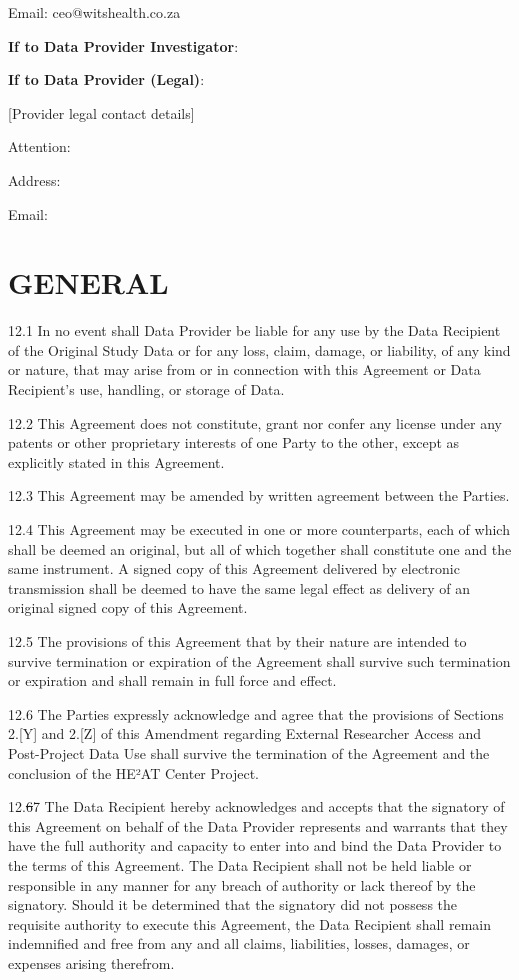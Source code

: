\documentclass[12pt,letterpaper]{article}
\newcommand{\deleted}[1]{\textcolor{deletecolor}{\sout{#1}}}
\newcommand{\added}[1]{\textcolor{addcolor}{#1}}
\begin{document}
Email: ceo@witshealth.co.za

\textbf{If to Data Provider Investigator}:

\textbf{If to Data Provider (Legal)}:

[Provider legal contact details]

Attention:

Address:

Email:

\section{GENERAL}

12.1 In no event shall Data Provider be liable for any use by the Data Recipient of the Original Study Data or for any loss, claim, damage, or liability, of any kind or nature, that may arise from or in connection with this Agreement or Data Recipient's use, handling, or storage of Data.

12.2 This Agreement does not constitute, grant nor confer any license under any patents or other proprietary interests of one Party to the other, except as explicitly stated in this Agreement.

12.3 This Agreement may be amended by written agreement between the Parties.

12.4 This Agreement may be executed in one or more counterparts, each of which shall be deemed an original, but all of which together shall constitute one and the same instrument. A signed copy of this Agreement delivered by electronic transmission shall be deemed to have the same legal effect as delivery of an original signed copy of this Agreement.

12.5 The provisions of this Agreement that by their nature are intended to survive termination or expiration of the Agreement shall survive such termination or expiration and shall remain in full force and effect.

\added{12.6 The Parties expressly acknowledge and agree that the provisions of Sections 2.[Y] and 2.[Z] of this Amendment regarding External Researcher Access and Post-Project Data Use shall survive the termination of the Agreement and the conclusion of the HE²AT Center Project.}

12.\deleted{6}\added{7} The Data Recipient hereby acknowledges and accepts that the signatory of this Agreement on behalf of the Data Provider represents and warrants that they have the full authority and capacity to enter into and bind the Data Provider to the terms of this Agreement. The Data Recipient shall not be held liable or responsible in any manner for any breach of authority or lack thereof by the signatory. Should it be determined that the signatory did not possess the requisite authority to execute this Agreement, the Data Recipient shall remain indemnified and free from any and all claims, liabilities, losses, damages, or expenses arising therefrom.
\end{document}
